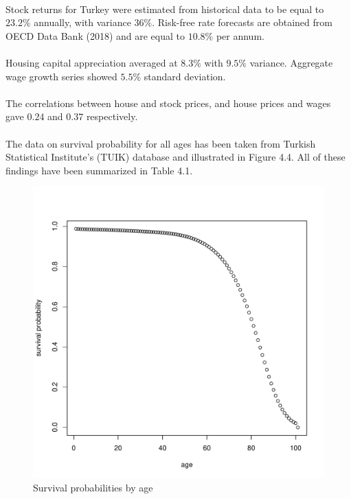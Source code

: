 \paragraph{}Stock returns for Turkey were estimated from historical data to be equal to $23.2\%$ annually, with variance $36\%$. Risk-free rate forecasts are obtained from OECD Data Bank (2018) and are equal to $10.8\%$ per annum.

\paragraph{}Housing capital appreciation averaged at $8.3\%$ with $9.5\%$ variance. Aggregate wage growth series showed $5.5\%$ standard deviation.

\paragraph{}The correlations between house and stock prices, and house prices and wages gave $0.24$ and $0.37$ respectively.

\paragraph{}The data on survival probability for all ages has been taken from Turkish Statistical Institute's (TUIK) database and illustrated in Figure 4.4. All of these findings have been summarized in Table 4.1. 

\begin{figure}[h]
	\centering
	\includegraphics[scale=0.6]{figs/survival.pdf}
	\caption{Survival probabilities by age}
\end{figure}

